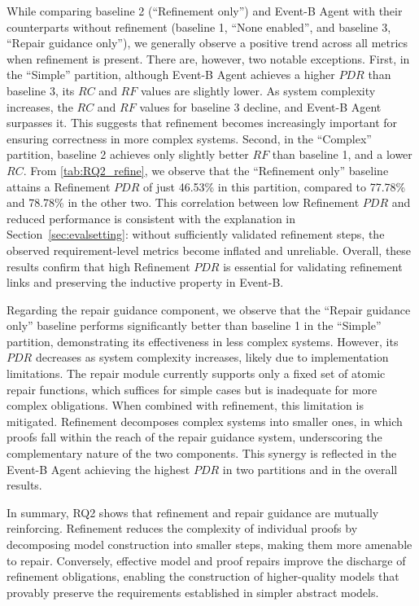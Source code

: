 
% 

While comparing baseline 2 (``Refinement only'') and Event-B Agent with their counterparts without refinement (baseline 1, ``None enabled'', and baseline 3, ``Repair guidance only''), we generally observe a positive trend across all metrics when refinement is present. 
There are, however, two notable exceptions. 
First, in the ``Simple'' partition, although Event-B Agent achieves a higher $PDR$ than baseline 3, its $RC$ and $RF$ values are slightly lower. 
As system complexity increases, the $RC$ and $RF$ values for baseline 3 decline, and Event-B Agent surpasses it. 
This suggests that refinement becomes increasingly important for ensuring correctness in more complex systems.
Second, in the ``Complex'' partition, baseline 2 achieves only slightly better $RF$ than baseline 1, and a lower $RC$. 
From \autoref{tab:RQ2_refine}, we observe that the ``Refinement only'' baseline attains a Refinement $PDR$ of just 46.53\% in this partition, compared to 77.78\% and 78.78\% in the other two. 
This correlation between low Refinement $PDR$ and reduced performance is consistent with the explanation in Section~\ref{sec:evalsetting}: without sufficiently validated refinement steps, the observed requirement-level metrics become inflated and unreliable.
Overall, these results confirm that high Refinement $PDR$ is essential for validating refinement links and preserving the inductive property in Event-B.

Regarding the repair guidance component, we observe that the ``Repair guidance only'' baseline performs significantly better than baseline 1 in the ``Simple'' partition, demonstrating its effectiveness in less complex systems. 
However, its $PDR$ decreases as system complexity increases, likely due to implementation limitations.
The repair module currently supports only a fixed set of atomic repair functions, which suffices for simple cases but is inadequate for more complex obligations.
When combined with refinement, this limitation is mitigated.
Refinement decomposes complex systems into smaller ones, in which proofs fall within the reach of the repair guidance system, underscoring the complementary nature of the two components.
This synergy is reflected in the Event-B Agent achieving the highest $PDR$ in two partitions and in the overall results.

In summary, RQ2 shows that refinement and repair guidance are mutually reinforcing. 
Refinement reduces the complexity of individual proofs by decomposing model construction into smaller steps, making them more amenable to repair. 
Conversely, effective model and proof repairs improve the discharge of refinement obligations, enabling the construction of higher-quality models that provably preserve the requirements established in simpler abstract models.


